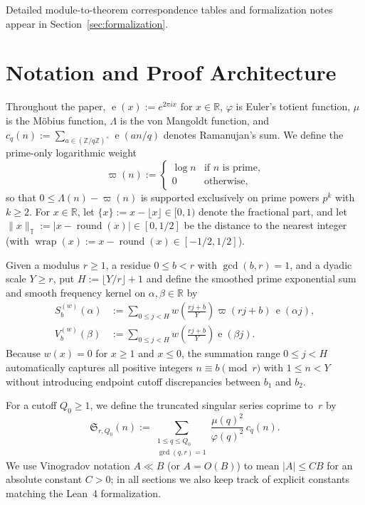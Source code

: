 \documentclass[11pt,reqno]{amsart}
\numberwithin{equation}{section}
\theoremstyle{definition}
\newcommand{\R}{\mathbb{R}}
\newcommand{\Z}{\mathbb{Z}}
\newcommand{\T}{\mathbb{T}}
\newcommand{\1}{\mathbf{1}}
\newcommand{\e}{\operatorname{e}}
\newcommand{\Sing}{\mathfrak{S}}
\begin{document}
Detailed module-to-theorem correspondence tables and formalization notes appear in Section~\ref{sec:formalization}.

\section{Notation and Proof Architecture}
\label{sec:notation}

Throughout the paper, $\e(x) := e^{2\pi i x}$ for $x \in \R$, $\varphi$ is Euler's totient function, $\mu$ is the M\"obius function, $\Lambda$ is the von Mangoldt function, and $c_q(n) := \sum_{a \in (\Z/q\Z)^\times} \e(an/q)$ denotes Ramanujan's sum. We define the prime-only logarithmic weight
\[
  \varpi(n) := \begin{cases} \log n & \text{if } n \text{ is prime,} \\ 0 & \text{otherwise,} \end{cases}
\]
so that $0 \le \Lambda(n) - \varpi(n)$ is supported exclusively on prime powers $p^k$ with $k \ge 2$. For $x \in \R$, let $\{x\} := x - \lfloor x\rfloor \in [0, 1)$ denote the fractional part, and let $\|x\|_\T := |x - \operatorname{round}(x)| \in [0, 1/2]$ be the distance to the nearest integer (with $\operatorname{wrap}(x) := x - \operatorname{round}(x) \in [-1/2, 1/2]$).

Given a modulus $r \ge 1$, a residue $0 \le b < r$ with $\gcd(b, r) = 1$, and a dyadic scale $Y \ge r$, put $H := \lfloor Y/r \rfloor + 1$ and define the smoothed prime exponential sum and smooth frequency kernel on $\alpha, \beta \in \R$ by
\begin{align}
  S_b^{(w)}(\alpha) &:= \sum_{0 \le j < H} w\!\left(\frac{r j + b}{Y}\right) \varpi(r j + b)\, \e(\alpha j), \label{eq:S-def}\\
  V_b^{(w)}(\beta) &:= \sum_{0 \le j < H} w\!\left(\frac{r j + b}{Y}\right) \e(\beta j). \label{eq:V-def}
\end{align}
Because $w(x) = 0$ for $x \ge 1$ and $x \le 0$, the summation range $0 \le j < H$ automatically captures all positive integers $n \equiv b \pmod r$ with $1 \le n < Y$ without introducing endpoint cutoff discrepancies between $b_1$ and $b_2$.

For a cutoff $Q_0 \ge 1$, we define the truncated singular series coprime to~$r$ by
\begin{equation}\label{eq:singular-trunc}
  \Sing_{r, Q_0}(n) := \sum_{\substack{1 \le q \le Q_0 \\ \gcd(q, r) = 1}} \frac{\mu(q)^2}{\varphi(q)^2}\, c_q(n).
\end{equation}
We use Vinogradov notation $A \ll B$ (or $A = O(B)$) to mean $|A| \le C B$ for an absolute constant $C > 0$; in all sections we also keep track of explicit constants matching the Lean~4 formalization.
\end{document}
